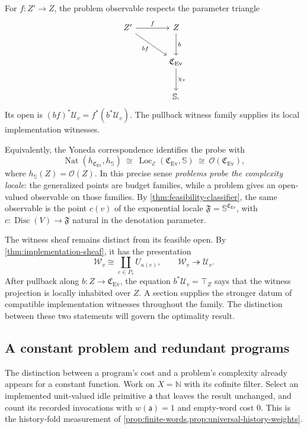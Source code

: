 \documentclass[11pt,a4paper]{article}
\numberwithin{algorithm}{section}
\numberwithin{equation}{section}
\theoremstyle{definition}
\theoremstyle{remark}
\theoremstyle{plain}
\newcommand{\E}{\mathcal E}
\newcommand{\N}{\mathbb N}
\newcommand{\OO}{\mathcal O}
\newcommand{\onto}{\twoheadrightarrow}
\newcommand{\Loc}{\operatorname{Loc}}
\newcommand{\Ev}{{\operatorname{Ev}}}
\newcommand{\Cplx}{\mathfrak C_{\Ev}}
\theoremstyle{definition}
\theoremstyle{plain}
\begin{document}
For $f:Z'\to Z$, the problem observable respects the parameter triangle
\[
\begin{tikzcd}[column sep=large,row sep=large]
 Z' \arrow[r,"{f}"] \arrow[dr,"{bf}"']
   & Z \arrow[d,"{b}"]\\
 & \Cplx \arrow[d,"{\chi_v}"]\\
 & \mathbb S .
\end{tikzcd}
\]
Its open is $(bf)^*\mathcal U_v=f^*(b^*\mathcal U_v)$.
The pullback witness family supplies its local implementation witnesses.


Equivalently, the Yoneda correspondence identifies the probe with
\[
 \operatorname{Nat}(h_{\Cplx},h_{\mathbb S})
 \ \cong\ \Loc_\E(\Cplx,\mathbb S)
 \ \cong\ \OO(\Cplx),
\]
where $h_{\mathbb S}(Z)=\OO(Z)$.  In this precise sense
\emph{problems probe the complexity locale}: the generalized points
are budget families, while a problem gives an open-valued observable
on those families.  By \cref{thm:feasibility-classifier}, the same
observable is the point $c(v)$ of the exponential locale
$\mathfrak F=\mathbb S^{\Cplx}$, with
$c:\operatorname{Disc}(V)\to\mathfrak F$ natural in the denotation
parameter.

The witness sheaf remains distinct from its feasible open.  By
\cref{thm:implementation-sheaf}, it has the presentation
\[
 \mathscr W_v\cong\coprod_{e\in P_v}U_{\kappa(e)},
 \qquad \mathscr W_v\onto\mathcal U_v.
\]
After pullback along $b:Z\to\Cplx$, the equation
$b^*\mathcal U_v=\top_Z$ says that the witness projection is
locally inhabited over $Z$. A section supplies the stronger datum
of compatible implementation witnesses throughout the family.
The distinction between these two statements will govern the
optimality result.

\subsection{A constant problem and redundant programs}
\label{app:complexity-constant-example}

The distinction between a program's cost and a problem's complexity
already appears for a constant function. Work on $X=\N$ with its
cofinite filter. Select an implemented unit-valued idle primitive
$\mathsf a$ that leaves the result unchanged, and count its recorded
invocations with $w(\mathsf a)=1$ and empty-word cost $0$.
This is the history-fold measurement of
\cref{prop:finite-words,prop:universal-history-weights}.
\end{document}
